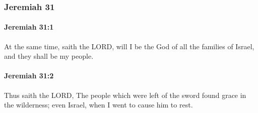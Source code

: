 	\subsubsection{Jeremiah 31} %
		\label{JEREMIAH-31}

		\paragraph{Jeremiah 31:1} %
			\label{JEREMIAH-31-1}

			At the same time, saith the LORD, will I be the God of all the families of Israel, and they shall be my people.


		\paragraph{Jeremiah 31:2} %
			\label{JEREMIAH-31-2}

			Thus saith the LORD, The people which were left of the sword found grace in the wilderness; even Israel, when I went to cause him to rest.

